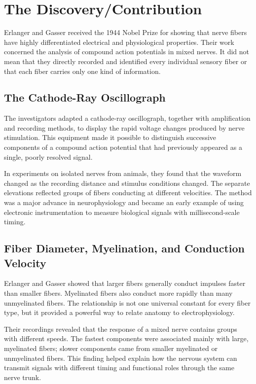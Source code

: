 \section{The Discovery/Contribution}

Erlanger and Gasser received the 1944 Nobel Prize for showing that nerve fibers have highly differentiated electrical and physiological properties. Their work concerned the analysis of compound action potentials in mixed nerves. It did not mean that they directly recorded and identified every individual sensory fiber or that each fiber carries only one kind of information.

\subsection{The Cathode-Ray Oscillograph}

The investigators adapted a cathode-ray oscillograph, together with amplification and recording methods, to display the rapid voltage changes produced by nerve stimulation. This equipment made it possible to distinguish successive components of a compound action potential that had previously appeared as a single, poorly resolved signal.

In experiments on isolated nerves from animals, they found that the waveform changed as the recording distance and stimulus conditions changed. The separate elevations reflected groups of fibers conducting at different velocities. The method was a major advance in neurophysiology and became an early example of using electronic instrumentation to measure biological signals with millisecond-scale timing.

\subsection{Fiber Diameter, Myelination, and Conduction Velocity}

Erlanger and Gasser showed that larger fibers generally conduct impulses faster than smaller fibers. Myelinated fibers also conduct more rapidly than many unmyelinated fibers. The relationship is not one universal constant for every fiber type, but it provided a powerful way to relate anatomy to electrophysiology.

Their recordings revealed that the response of a mixed nerve contains groups with different speeds. The fastest components were associated mainly with large, myelinated fibers; slower components came from smaller myelinated or unmyelinated fibers. This finding helped explain how the nervous system can transmit signals with different timing and functional roles through the same nerve trunk.


